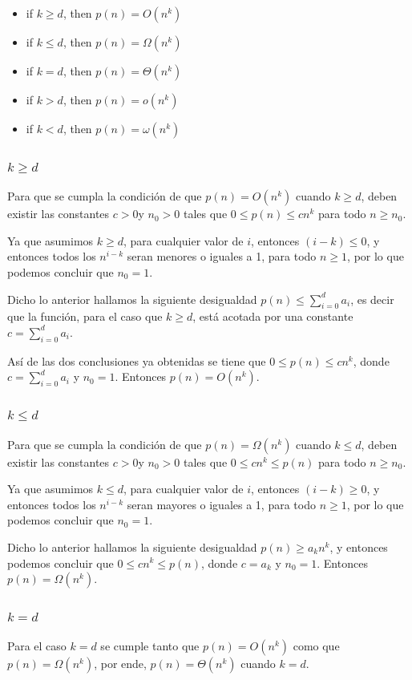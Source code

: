 \documentclass{article}
\begin{document}
\begin{itemize}
	\item if $k \geq d$, then $p(n) = O(n^k)$
	\item if $k \leq d$, then $p(n) = \Omega(n^k)$
	\item if $k = d$, then $p(n) = \Theta(n^k)$
	\item if $k > d$, then $p(n) = o(n^k)$
	\item if $k < d$, then $p(n) = \omega(n^k)$
\end{itemize}

\subsubsection{$k \geq d$}
Para que se cumpla la condición de que $p(n) = O(n^k)$ cuando $k \geq d$, deben existir las constantes $c > 0$y $n_0 > 0$ tales que $0 \leq p(n) \leq cn^k$ para todo $n \geq n_0$.

Ya que asumimos $k \geq d$, para cualquier valor de $i$, entonces $(i-k) \leq 0$, y entonces todos los $n^{i-k}$ seran menores o iguales a 1, para todo $n \geq 1$, por lo que podemos concluir que $n_0 = 1$.

Dicho lo anterior hallamos la siguiente desigualdad $p(n) \leq \sum_{i=0}^{d} a_i$, es decir que la función, para el caso que $k \geq d$, está acotada por una constante $c = \sum_{i=0}^{d} a_i$.

Así de las dos conclusiones ya obtenidas se tiene que $0 \leq p(n) \leq cn^k$, donde $c = \sum_{i=0}^{d} a_i$ y $n_0 = 1$. Entonces $p(n) = O(n^k)$.

\subsubsection{$k \leq d$}
Para que se cumpla la condición de que $p(n) = \Omega(n^k)$ cuando $k \leq d$, deben existir las constantes $c > 0$y $n_0 > 0$ tales que $0 \leq cn^k \leq p(n)$ para todo $n \geq n_0$.

Ya que asumimos $k \leq d$, para cualquier valor de $i$, entonces $(i-k) \geq 0$, y entonces todos los $n^{i-k}$ seran mayores o iguales a 1, para todo $n \geq 1$, por lo que podemos concluir que $n_0 = 1$.

Dicho lo anterior hallamos la siguiente desigualdad $p(n) \geq a_k n^k$, y entonces podemos concluir que $0 \leq cn^k \leq p(n)$, donde $c = a_k$ y $n_0 = 1$. Entonces $p(n) = \Omega(n^k)$.

\subsubsection{$k = d$}
Para el caso $k = d$ se cumple tanto que $p(n) = O(n^k)$ como que $p(n) = \Omega(n^k)$, por ende, $p(n) = \Theta(n^k)$ cuando $k = d$.
\end{document}
